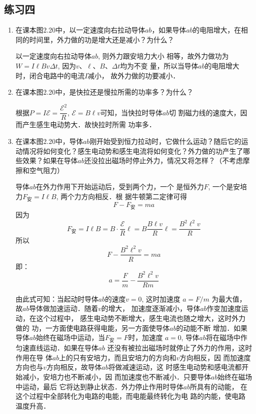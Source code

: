 \subsection{练习四}
\begin{enumerate}
    \item 在课本图2.20中，以一定速度向右拉动导体$ab$，如果导体$ab$的电阻增大，在相同的时间里，外力做的功是增大还是减小？为什么？

    \begin{solution}
        以一定速度向右拉动导体$ab$, 则外力跟安培力大小
        相等，故外力做功为$W=I\ell Bv\Delta t$, 因为$v$、$\ell$、$B$、$\Delta t$均为不变
        量，所以当导体$ab$的电阻增大时，闭合电路中的电流$I$减小，
        故外力做的功要减小．
    \end{solution}
    
    \item 在课本图2.20中，是快拉还是慢拉所需的功率多？为什么？

    \begin{solution}
        根据$P=I\mathcal{E}=\dfrac{\mathcal{E}^2}{R}$,       $\mathcal{E}=B\ell v$可知，当快拉时导体$ab$切
        割磁力线的速度大，因而产生感生电动势大．故快拉时所需
        功率多．
    \end{solution}
    
    \item 在课本图2.20中，导体$ab$刚开始受到恒力拉动时，它做什么运动？随后它的运动情况将如何变化？感生电动势和感生电流将如何变化？外力做的功产生了哪些效果？如果在导体$ab$还没拉出磁场时停止外力，情况又将怎样？（不考虑摩擦和空气阻力）

    \begin{solution}
        导体$ab$在外力作用下开始运动后，受到两个力，一个
        是恒外力$F$, 一个是安培力$F_{\text{安}}=I\ell B$, 两个力方向相反．根
        据牛顿第二定律可得
\[F-F_{\text{安}}=ma\]
因为
\[F_{\text{安}}=I\ell B=B\cdot \dfrac{\mathcal{E}}{R}\ell =B\frac{B\ell v}{R}\ell =\frac{B^2\ell^2 v}{R}\]
所以
\[F-\frac{B^2\ell^2 v}{R}=ma\]
即：
\[a=\frac{F}{m}-\frac{B^2\ell^2 v}{Rm}\]

由此式可知：当起动时导体$ab$的速度$v=0$, 这时加速度
$a=F/m$
为最大值，故$ab$导体做加速运动．随着$v$的增大，
加速度逐渐减小，导体$ab$作变加速度运动，在这个过程中，
感生电动势不断增大，感生电流也随之增大，这时外力做的
功，一方面使电路获得电能，另一方面使导体$ab$的动能不断
增加．如果导体$ab$始终在磁场中运动，当$F_{\text{安}}=F$时，加速度
$a=0$, 导体$ab$将在磁场中作匀速直线运动．如果在导体$ab$
还没有被拉出磁场时就停止了外力的作用，这时作用在导
体$ab$上的只有安培力，而且安培力的方向和$v$方向相反，因
而加速度方向也与$v$方向相反，故导体$ab$将做减速运动，这
时感生电动势和感电流都开始减小，安培力也不断减小，因
而加速度也不断减小．只要导体$ab$始终在磁场中运动，最后
它将达到静止状态．外力停止作用时导体$ab$所具有的动能，
在这个过程中全部转化为电路的电能，而电能最终转化为电
路的内能，使电路温度升高．
    \end{solution}
    
\end{enumerate}



